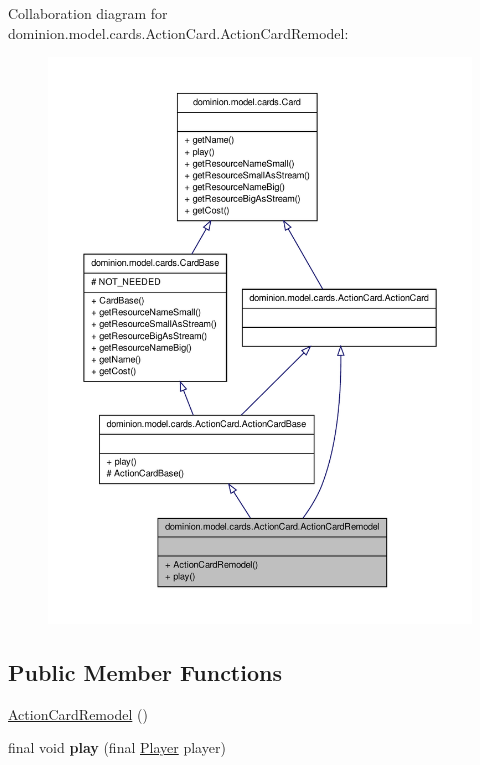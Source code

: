 \-Collaboration diagram for dominion.\-model.\-cards.\-Action\-Card.\-Action\-Card\-Remodel\-:
\nopagebreak
\begin{figure}[H]
\begin{center}
\leavevmode
\includegraphics[width=350pt]{classdominion_1_1model_1_1cards_1_1ActionCard_1_1ActionCardRemodel__coll__graph}
\end{center}
\end{figure}
\subsection*{\-Public \-Member \-Functions}
\begin{DoxyCompactItemize}
\item 
\hyperlink{classdominion_1_1model_1_1cards_1_1ActionCard_1_1ActionCardRemodel_a3e629307a52ee8f726aa617ee2ddb1bc}{\-Action\-Card\-Remodel} ()
\item 
\hypertarget{classdominion_1_1model_1_1cards_1_1ActionCard_1_1ActionCardRemodel_a5786e7945666f76f5c49379ee126429b}{final void {\bfseries play} (final \hyperlink{interfacedominion_1_1model_1_1Player}{\-Player} player)}\label{classdominion_1_1model_1_1cards_1_1ActionCard_1_1ActionCardRemodel_a5786e7945666f76f5c49379ee126429b}

\end{DoxyCompactItemize}


